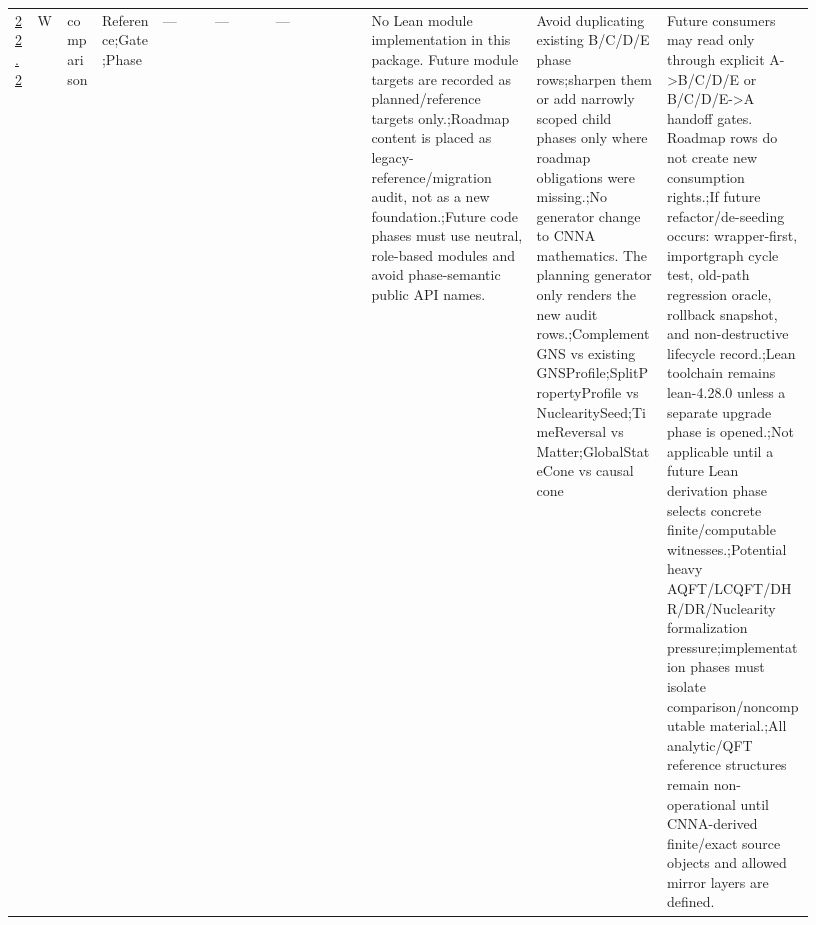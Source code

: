 \begin{longtable}{L{0.026\linewidth} L{0.024\linewidth} L{0.045\linewidth} L{0.07\linewidth} L{0.065\linewidth} L{0.075\linewidth} L{0.11\linewidth} L{0.19\linewidth} L{0.155\linewidth} L{0.17\linewidth}}
\hline
\addlinespace[0.24em]
\hyperlink{phase-row-22-2}{22.2} & W & comparison & Reference;\newline Gate;\newline Phase & --- & --- & --- & No Lean module implementation in this package. Future module targets are recorded as planned/\allowbreak{}reference targets only.;\newline Roadmap content is placed as legacy-reference/\allowbreak{}migration audit, not as a new foundation.;\newline Future code phases must use neutral, role-based modules and avoid phase-semantic public API names. & Avoid duplicating existing B/\allowbreak{}C/\allowbreak{}D/\allowbreak{}E phase rows;\newline sharpen them or add narrowly scoped child phases only where roadmap obligations were missing.;\newline No generator change to CNNA mathematics. The planning generator only renders the new audit rows.;\newline ComplementGNS vs existing GNSProfile;\newline SplitPropertyProfile vs NuclearitySeed;\newline TimeReversal vs Matter;\newline GlobalStateCone vs causal cone & Future consumers may read only through explicit A->B/\allowbreak{}C/\allowbreak{}D/\allowbreak{}E or B/\allowbreak{}C/\allowbreak{}D/\allowbreak{}E->A handoff gates. Roadmap rows do not create new consumption rights.;\newline If future refactor/\allowbreak{}de-seeding occurs: wrapper-first, importgraph cycle test, old-path regression oracle, rollback snapshot, and non-destructive lifecycle record.;\newline Lean toolchain remains lean-4.28.0 unless a separate upgrade phase is opened.;\newline Not applicable until a future Lean derivation phase selects concrete finite/\allowbreak{}computable witnesses.;\newline Potential heavy AQFT/\allowbreak{}LCQFT/\allowbreak{}DHR/\allowbreak{}DR/\allowbreak{}Nuclearity formalization pressure;\newline implementation phases must isolate comparison/\allowbreak{}noncomputable material.;\newline All analytic/\allowbreak{}QFT reference structures remain non-operational until CNNA-derived finite/\allowbreak{}exact source objects and allowed mirror layers are defined.\\

\end{longtable}
